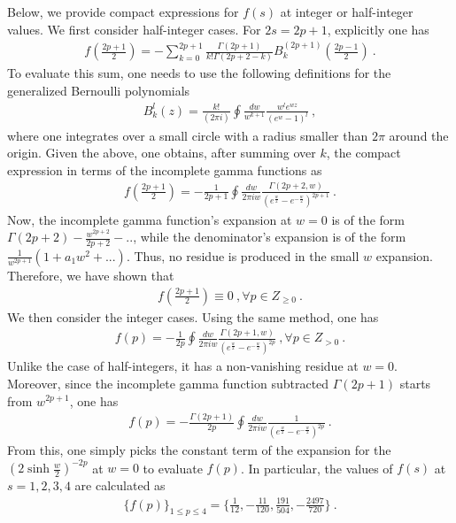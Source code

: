 \documentclass[a4paper,11pt]{article}
\begin{document}
Below, we provide compact expressions for $f(s)$ at integer or half-integer values. We first consider half-integer cases. For $2s=2p+1$, explicitly one has
\begin{align}
f\left(\frac{2p+1}{2}\right)=-\sum_{k=0}^{2p+1}\frac{\Gamma(2p+1)}{k!\Gamma(2p+2-k)}B_k^{(2p+1)}\left(\frac{2p-1}{2}\right) \ .
\end{align}
To evaluate this sum, one needs to use the following definitions for the generalized Bernoulli polynomials
\begin{align}
B_k^{l}(z)=\frac{k!}{(2\pi i)}\oint \frac{dw}{w^{k+1}}\frac{w^le^{wz}}{(e^{w}-1)^l} \ ,
\end{align}
where one integrates over a small circle with a radius smaller than $2\pi$ around the origin. Given the above, one obtains, after summing over $k$, the compact expression in terms of the incomplete gamma functions as
\begin{align}
f\left(\frac{2p+1}{2}\right)=-\frac{1}{2p+1}\oint \frac{dw}{2\pi i w} \frac{ \Gamma (2 p+2,w)}{(e^{\frac{w}{2}}-e^{-\frac{w}{2}})^{2p+1}} \ .
\end{align}
Now, the incomplete gamma function's expansion at $w=0$ is of the form $\Gamma(2p+2)-\frac{w^{2p+2}}{2p+2}-..$, while the denominator's expansion is of the form $\frac{1}{w^{2p+1}}(1+a_1w^2+...)$. Thus, no residue is produced in the small $w$ expansion. Therefore, we have shown that 
\begin{align}
f\left(\frac{2p+1}{2}\right) \equiv 0 \ , \forall p\in Z_{\ge 0} \ .
\end{align}
We then consider the integer cases. Using the same method, one has
\begin{align}
f(p)=-\frac{1}{2p}\oint \frac{dw}{2\pi i w} \frac{ \Gamma (2 p+1,w)}{(e^{\frac{w}{2}}-e^{-\frac{w}{2}})^{2p}}\ , \forall p\in Z_{>0} \ .
\end{align}
Unlike the case of half-integers, it has a non-vanishing residue at $w=0$. Moreover, since the incomplete gamma function subtracted $\Gamma(2p+1)$ starts from $w^{2p+1}$, one has
\begin{align}
f(p)=-\frac{\Gamma(2p+1)}{2p}\oint \frac{dw}{2\pi i w} \frac{ 1}{(e^{\frac{w}{2}}-e^{-\frac{w}{2}})^{2p}} \ .
\end{align}
From this, one simply picks the constant term of the expansion for the $(2\sinh \frac{w}{2})^{-2p}$ at $w=0$ to evaluate $f(p)$. In particular, the values of $f(s)$ at $s=1,2,3,4$ are calculated as
\begin{align}
\{f(p)\}_{1 \le p\le 4}=\bigg\{\frac{1}{12},-\frac{11}{120},\frac{191}{504},-\frac{2497}{720}\bigg\} \ .
\end{align}
\end{document}
